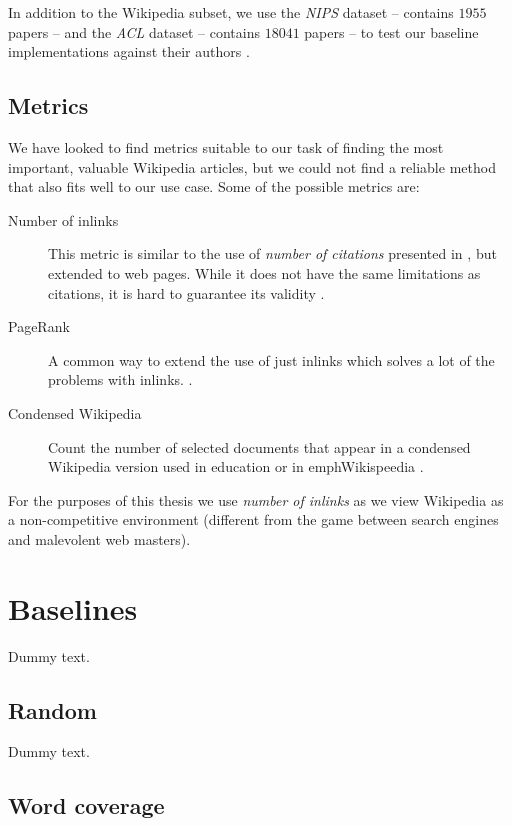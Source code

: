 In addition to the Wikipedia subset, we use the \emph{\acf{NIPS}} dataset --
contains \(1955\) papers -- and the \emph{\acf{ACL}} dataset -- contains
\(18041\) papers -- to test our baseline implementations against their authors
\cite{sipos2012temporal}.

\subsection{Metrics}

We have looked to find metrics suitable to our task of finding the most
important, valuable Wikipedia articles, but we could not find a reliable method
that also fits well to our use case.
Some of the possible metrics are:
\begin{description}
  \item[Number of inlinks] This metric is similar to the use of \emph{number of
  citations} presented in \cite{sipos2012temporal}, but extended to web pages.
  While it does not have the same limitations as citations, it is hard to
  guarantee its validity .
  \item[PageRank] A common way to extend the use of just inlinks which solves a
  lot of the problems with inlinks.
  .
  \item[Condensed Wikipedia] Count the number of selected documents that appear
  in a condensed Wikipedia version used in education or in emph{Wikispeedia}
  .
\end{description}

For the purposes of this thesis we use \emph{number of inlinks} as we view
Wikipedia as a non-competitive environment (different from the game between
search engines and malevolent web masters).

\section{Baselines}

Dummy text.

\subsection{Random}

Dummy text.

\subsection{Word coverage}


